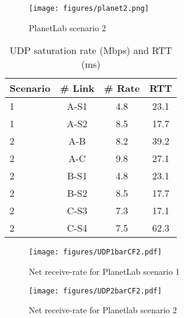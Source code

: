 \documentclass{sig-alternate-10pt}
\begin{document}
\begin{figure}[t]
\centering
\texttt{[image: figures/planet2.png]}
\caption{PlanetLab scenario 2}
\label{f:plscen2}
\vspace{-10pt}
\end{figure}

\begin{table}
    \centering
    \caption{UDP saturation rate (Mbps) and RTT (ms)}
    \label{table:1}
    \begin{tabular}{l c c c}
Scenario & \# Link & \# Rate & RTT \\ 
    \hline
    \hline
    1 & A-S1  & 4.8 & 23.1 \\ 
    1 & A-S2  & 8.5 & 17.7 \\ 
    2 & A-B  & 8.2 & 39.2 \\ 
    2 & A-C  & 9.8 & 27.1 \\
    2 & B-S1  & 4.8 & 23.1 \\ 
    2 & B-S2  & 8.5 & 17.7 \\ 
    2 & C-S3  & 7.3 & 17.1 \\ 
    2 & C-S4  & 7.5 & 62.3 \\
    
    \end{tabular}
    \vspace{-10pt}
\end{table}

\begin{figure}[t]
\centering
\texttt{[image: figures/UDP1barCF2.pdf]}
\caption{Net receive-rate for PlanetLab scenario 1}
\label{f:plrate1}
\vspace{-10pt}
\end{figure}

\begin{figure}[t]
\centering
\texttt{[image: figures/UDP2barCF2.pdf]}
\caption{Net receive-rate for Planetlab scenario 2}
\label{f:plrate2}
\vspace{-10pt}
\end{figure}
\end{document}
